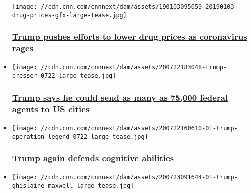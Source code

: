 \begin{itemize}
  \texttt{[image: //cdn.cnn.com/cnnnext/dam/assets/190103095059-20190103-drug-prices-gfx-large-tease.jpg]}

  \hypertarget{trump-pushes-efforts-to-lower-drug-prices-as-coronavirus-rages}{%
  \subsubsection{\texorpdfstring{\href{/2020/07/24/politics/trump-drug-prices/index.html}{Trump
  pushes efforts to lower drug prices as coronavirus
  rages}}{Trump pushes efforts to lower drug prices as coronavirus rages}}\label{trump-pushes-efforts-to-lower-drug-prices-as-coronavirus-rages}}
\item
  \href{/2020/07/23/politics/trump-federal-agents-us-cities/index.html}{}

  \texttt{[image: //cdn.cnn.com/cnnnext/dam/assets/200722183048-trump-presser-0722-large-tease.jpg]}

  \hypertarget{trump-says-he-could-send-as-many-as-75000-federal-agents-to-us-cities}{%
  \subsubsection{\texorpdfstring{\href{/2020/07/23/politics/trump-federal-agents-us-cities/index.html}{Trump
  says he could send as many as 75,000 federal agents to US
  cities}}{Trump says he could send as many as 75,000 federal agents to US cities}}\label{trump-says-he-could-send-as-many-as-75000-federal-agents-to-us-cities}}
\item
  \href{/2020/07/23/politics/donald-trump-cognitive-abilities/index.html}{}

  \texttt{[image: //cdn.cnn.com/cnnnext/dam/assets/200722160610-01-trump-operation-legend-0722-large-tease.jpg]}

  \hypertarget{trump-again-defends-cognitive-abilities}{%
  \subsubsection{\texorpdfstring{\href{/2020/07/23/politics/donald-trump-cognitive-abilities/index.html}{Trump
  again defends cognitive
  abilities}}{Trump again defends cognitive abilities}}\label{trump-again-defends-cognitive-abilities}}
\item
  \href{/2020/07/23/politics/donald-trump-ghislaine-maxwell-jeffrey-epstein-history/index.html}{}

  \texttt{[image: //cdn.cnn.com/cnnnext/dam/assets/200723091644-01-trump-ghislaine-maxwell-large-tease.jpg]}


\end{itemize}
